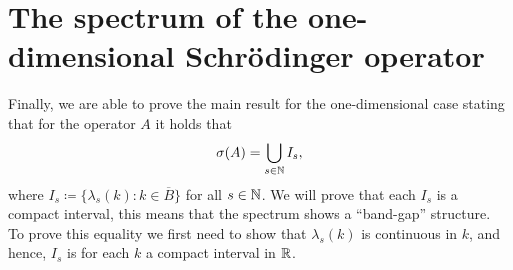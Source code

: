 \chapter{The spectrum of the one-dimensional Schrödinger operator} \label{chap:6}
Finally, we are able to prove the main result for the one-dimensional case stating that for the operator $A$ it holds that
	\begin{equation}
		\sigma(A) = \bigcup_{s \in \mathbb{N}} I_{s}, \label{MainResult}
	\end{equation}
where $I_{s} \coloneqq \{ \lambda_{s}(k) : k \in \overline{B} \}$ for all $s \in \mathbb{N}$. We will prove that each $I_{s}$ is a compact interval, this means that the spectrum shows a \enquote{band-gap} structure. 
~\\

To prove this equality we first need to show that $\lambda_{s}(k)$ is continuous in $k$, and hence, $I_{s}$ is for each $k$ a compact interval in $\mathbb{R}$.


